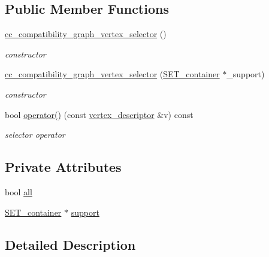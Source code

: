\subsection*{Public Member Functions}
\begin{DoxyCompactItemize}
\item 
\hyperlink{structcc__compatibility__graph__vertex__selector_abe02d814700d4140257b4dd840741aa4}{cc\+\_\+compatibility\+\_\+graph\+\_\+vertex\+\_\+selector} ()
\begin{DoxyCompactList}\small\item\em constructor \end{DoxyCompactList}\item 
\hyperlink{structcc__compatibility__graph__vertex__selector_a0db7646aa7d08d3bd66815b561dbb682}{cc\+\_\+compatibility\+\_\+graph\+\_\+vertex\+\_\+selector} (\hyperlink{structcc__compatibility__graph__vertex__selector_abe217f0679bd4c93a9492844634d4e82}{S\+E\+T\+\_\+container} $\ast$\+\_\+support)
\begin{DoxyCompactList}\small\item\em constructor \end{DoxyCompactList}\item 
bool \hyperlink{structcc__compatibility__graph__vertex__selector_aedbea67407c81d89f24246e52726fee3}{operator()} (const \hyperlink{structcc__compatibility__graph__vertex__selector_a445b79c6570f741f69230996f98df72b}{vertex\+\_\+descriptor} \&v) const
\begin{DoxyCompactList}\small\item\em selector operator \end{DoxyCompactList}\end{DoxyCompactItemize}
\subsection*{Private Attributes}
\begin{DoxyCompactItemize}
\item 
bool \hyperlink{structcc__compatibility__graph__vertex__selector_ae9a1879eeca1b4125dee12853f9606ae}{all}
\item 
\hyperlink{structcc__compatibility__graph__vertex__selector_abe217f0679bd4c93a9492844634d4e82}{S\+E\+T\+\_\+container} $\ast$ \hyperlink{structcc__compatibility__graph__vertex__selector_a81ef668d369aa3cfd7c13074e77f55fb}{support}
\end{DoxyCompactItemize}


\subsection{Detailed Description}
